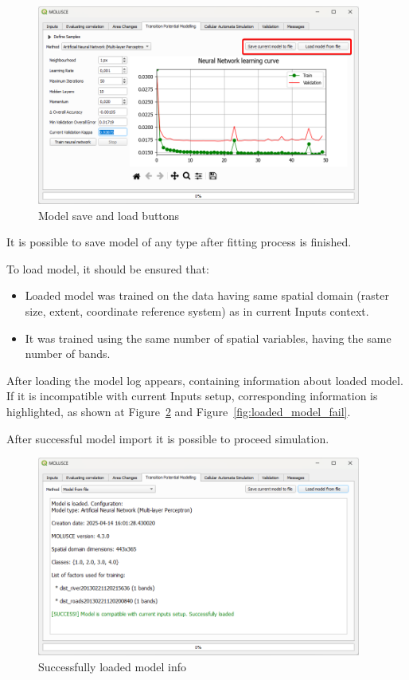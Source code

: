 \documentclass{report}
\begin{document}
\begin{figure}[h!]
	\centering
	\includegraphics[width=0.95\textwidth]{img/saveload_buttons.png}
	\caption{Model save and load buttons}
	\label{fig:saveload_buttons}
\end{figure}

It is possible to save model of any type after fitting process is finished.

To load model, it should be ensured that:
\begin{itemize}
	\item Loaded model was trained on the data having same spatial domain (raster size, extent, coordinate reference system) as in current Inputs context.
	\item It was trained using the same number of spatial variables, having the same number of bands.
\end{itemize}

After loading the model log appears, containing information about loaded model. If it is incompatible with current Inputs setup, corresponding information is highlighted, as shown at Figure~\ref{fig:loaded_model_success} and Figure~\ref{fig:loaded_model_fail}.

After successful model import it is possible to proceed simulation.

\begin{figure}[h]
	\centering
	\includegraphics[width=0.95\textwidth]{img/loaded_model_success.png}
	\caption{Successfully loaded model info}
	\label{fig:loaded_model_success}
\end{figure}
\end{document}

